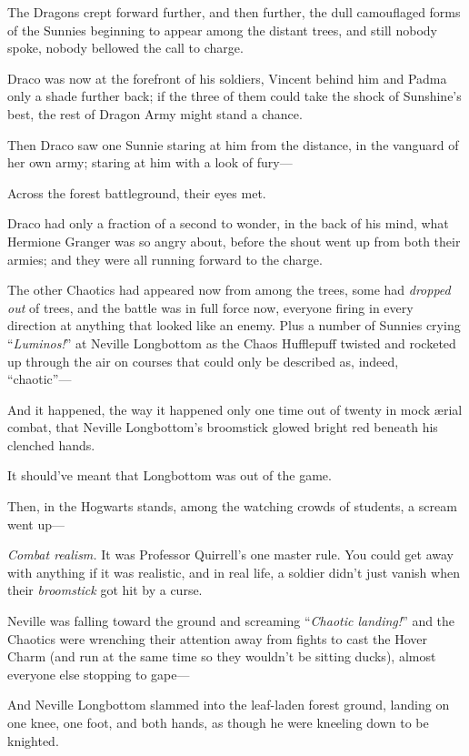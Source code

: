 The Dragons crept forward further, and then further, the dull camouflaged forms of the Sunnies beginning to appear among the distant trees, and still nobody spoke, nobody bellowed the call to charge.

Draco was now at the forefront of his soldiers, Vincent behind him and Padma only a shade further back; if the three of them could take the shock of Sunshine’s best, the rest of Dragon Army might stand a chance.

Then Draco saw one Sunnie staring at him from the distance, in the vanguard of her own army; staring at him with a look of fury—

Across the forest battleground, their eyes met.

Draco had only a fraction of a second to wonder, in the back of his mind, what Hermione Granger was so angry about, before the shout went up from both their armies; and they were all running forward to the charge.

\later

The other Chaotics had appeared now from among the trees, some had \emph{dropped out} of trees, and the battle was in full force now, everyone firing in every direction at anything that looked like an enemy. Plus a number of Sunnies crying “\emph{Luminos!}” at Neville Longbottom as the Chaos Hufflepuff twisted and rocketed up through the air on courses that could only be described as, indeed, “chaotic”—

And it happened, the way it happened only one time out of twenty in mock ærial combat, that Neville Longbottom’s broomstick glowed bright red beneath his clenched hands.

It should’ve meant that Longbottom was out of the game.

Then, in the Hogwarts stands, among the watching crowds of students, a scream went up—

\emph{Combat realism.} It was Professor Quirrell’s one master rule. You could get away with anything if it was realistic, and in real life, a soldier didn’t just vanish when their \emph{broomstick} got hit by a curse.

Neville was falling toward the ground and screaming “\emph{Chaotic landing!}” and the Chaotics were wrenching their attention away from fights to cast the Hover Charm (and run at the same time so they wouldn’t be sitting ducks), almost everyone else stopping to gape—

And Neville Longbottom slammed into the leaf-laden forest ground, landing on one knee, one foot, and both hands, as though he were kneeling down to be knighted.

